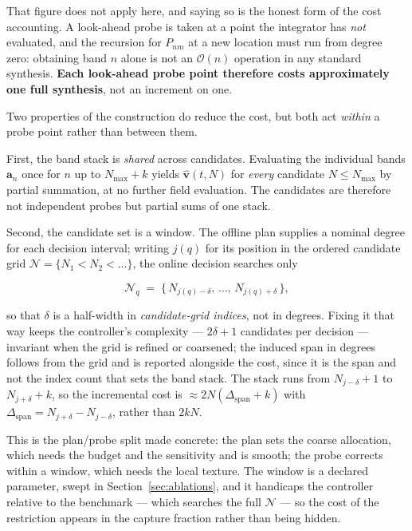 That figure does not apply here, and saying so is the honest form of the cost
accounting. A look-ahead probe is taken at a point the integrator has \emph{not}
evaluated, and the recursion for $P_{nm}$ at a new location must run from
degree zero: obtaining band $n$ alone is not an $\mathcal{O}(n)$ operation in
any standard synthesis. \textbf{Each look-ahead probe point therefore costs
approximately one full synthesis}, not an increment on one.

Two properties of the construction do reduce the cost, but both act
\emph{within} a probe point rather than between them.

First, the band stack is \emph{shared} across candidates. Evaluating the individual bands
$\mathbf a_n$ once for $n$ up to $N_{\max}{+}k$ yields
$\hat{\mathbf v}(t,N)$ for \emph{every} candidate $N\le N_{\max}$ by partial
summation, at no further field evaluation. The candidates are therefore not
independent probes but partial sums of one stack.

Second, the candidate set is a window. The offline plan supplies a nominal
degree for each decision interval; writing $j(q)$ for its position in the
ordered candidate grid $\mathcal{N}=\{N_1<N_2<\dots\}$, the online decision
searches only

\begin{equation}
  \mathcal{N}_q \;=\; \{\,N_{j(q)-\delta},\,\dots,\,N_{j(q)+\delta}\,\} ,
  \label{eq:window}
\end{equation}

so that $\delta$ is a half-width in \emph{candidate-grid indices}, not in
degrees. Fixing it that way keeps the controller's complexity ---
$2\delta+1$ candidates per decision --- invariant when the grid is refined or
coarsened; the induced span in degrees follows from the grid and is reported
alongside the cost, since it is the span and not the index count that sets the
band stack. The stack runs from $N_{j-\delta}{+}1$ to $N_{j+\delta}{+}k$, so
the incremental cost is $\approx 2N(\Delta_{\mathrm{span}}+k)$ with
$\Delta_{\mathrm{span}}=N_{j+\delta}-N_{j-\delta}$, rather than $2kN$.

This is the plan/probe split made concrete: the plan sets the coarse
allocation, which needs the budget and the sensitivity and is smooth; the probe
corrects within a window, which needs the local texture. The window is a
declared parameter, swept in Section~\ref{sec:ablations}, and it handicaps the
controller relative to the benchmark --- which searches the full $\mathcal{N}$
--- so the cost of the restriction appears in the capture fraction rather than
being hidden.

